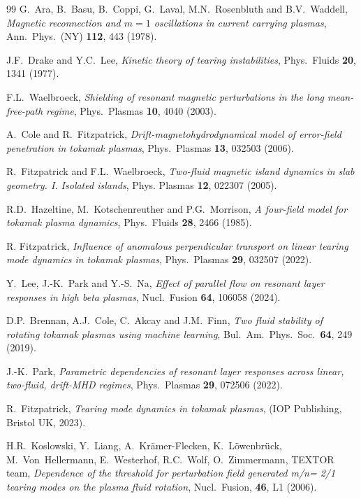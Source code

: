 \documentclass[12pt,prb,aps]{revtex4-1}
\begin{document}
\begin{thebibliography}{99}
 G.~Ara, B.~Basu, B.~Coppi, G.~Laval, M.N.~Rosenbluth and B.V.~Waddell,  {\em Magnetic reconnection and $m = 1$ oscillations in current carrying plasmas}, Ann.\ Phys.\ (NY) {\bf 112}, 443 (1978).

 J.F.~Drake and Y.C.~Lee, {\em Kinetic theory of tearing instabilities}, Phys.\ Fluids {\bf 20}, 1341 (1977).

 F.L.~Waelbroeck, {\em Shielding of resonant magnetic perturbations in the long mean-free-path regime}, Phys.\ Plasmas {\bf 10}, 4040 (2003).

 A.~Cole and R.~Fitzpatrick, {\em Drift-magnetohydrodynamical model of error-field penetration in tokamak plasmas}, Phys.\ Plasmas {\bf 13}, 032503 (2006).

 R.~Fitzpatrick and F.L.~Waelbroeck, {\em Two-fluid magnetic island dynamics in slab geometry. I. Isolated islands}, Phys. Plasmas {\bf 12}, 022307 (2005).

 R.D.~Hazeltine, M.~Kotschenreuther and P.G.~Morrison, {\em A four-field model for tokamak plasma dynamics}, Phys.\ Fluids {\bf 28}, 2466 (1985).

 R. Fitzpatrick,  {\em Influence of anomalous perpendicular transport on linear tearing mode dynamics in tokamak plasmas}, Phys.\ Plasmas {\bf 29}, 032507 (2022).

 Y.~Lee, J.-K.~Park and Y.-S.~Na, {\em Effect of parallel flow on resonant layer responses in high beta plasmas}, Nucl.\ Fusion {\bf 64}, 106058 (2024).

 D.P.~Brennan, A.J.~Cole, C.~Akcay and J.M.~Finn, {\em Two fluid stability of rotating tokamak plasmas using machine learning}, Bul.\ Am.\ Phys.\ Soc.\ {\bf 64}, 249 (2019).

 J.-K.~Park, {\em Parametric dependencies of resonant layer responses across linear, two-fluid, drift-MHD regimes},  Phys.\ Plasmas {\bf 29}, 072506 (2022).

 R.~Fitzpatrick, {\em Tearing mode dynamics in tokamak plasmas}, (IOP Publishing, Bristol UK, 2023). 

 H.R.~Koslowski, Y.~Liang, A.~Kr\"{a}mer-Flecken, K.~L\"{o}wenbr\"{u}ck, M.~Von~Hellermann, E.~Westerhof,
R.C.~Wolf, O.~Zimmermann, TEXTOR team, {\em Dependence of the threshold for perturbation
field generated m/n= 2/1 tearing modes on the plasma fluid rotation}, Nucl.\ Fusion, {\bf 46}, L1 (2006).


\end{thebibliography}
\end{document}
